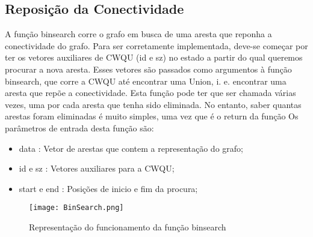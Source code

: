 \documentclass[14pt]{article}
\begin{document}
    \subsection[binsearch]{Reposição da Conectividade}
    A função binsearch corre o grafo em busca de uma aresta que reponha a conectividade do grafo.
    Para ser corretamente implementada, deve-se começar por ter os vetores auxiliares de CWQU (id e sz) no estado a partir
    do qual queremos procurar a nova aresta.
    Esses vetores são passados como argumentos à função binsearch, que corre a CWQU até encontrar uma Union, i. e. encontrar
    uma aresta que repõe a conectividade.
    Esta função pode ter que ser chamada várias vezes, uma por cada aresta que tenha sido eliminada. No entanto, saber quantas
    arestas foram eliminadas é muito simples, uma vez que é o return da função 
    Os parâmetros de entrada desta função são:
    \begin{itemize}
        \item data : Vetor de arestas que contem a representação do grafo;
        \item id e sz : Vetores auxiliares para a CWQU;
        \item start e end : Posições de inicio e fim da procura;
    \end{itemize}
    \begin{figure}[H]
        \centering
        \texttt{[image: BinSearch.png]}
        \label{fig:BinSearch}
        \caption{Representação do funcionamento da função binsearch}
    \end{figure}
\end{document}

